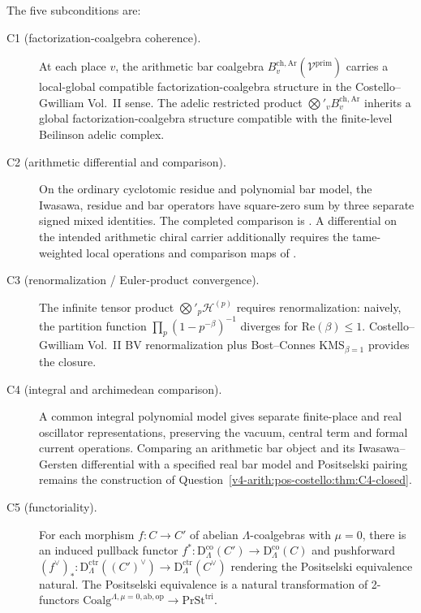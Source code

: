 The five subconditions are:
\begin{description}
\item[C1 (factorization-coalgebra coherence).] At each place \(v\),
the arithmetic bar coalgebra
\(B^{\mathrm{ch,Ar}}_{v}(\mathcal{V}^{\mathrm{prim}})\) carries a
local-global compatible factorization-coalgebra structure in the
Costello--Gwilliam Vol.~II sense. The adelic restricted product
\(\bigotimes'_{v}B^{\mathrm{ch,Ar}}_{v}\) inherits a global
factorization-coalgebra structure compatible with the
finite-level Beilinson adelic complex.
\item[C2 (arithmetic differential and comparison).] On the ordinary
cyclotomic residue and polynomial bar model, the Iwasawa, residue and
bar operators have square-zero sum by three separate signed mixed
identities. The completed comparison is
.
A differential on the intended arithmetic chiral carrier additionally
requires the tame-weighted local operations and comparison maps of
.
\item[C3 (renormalization / Euler-product convergence).] The
infinite tensor product \(\bigotimes'_{p}\mathcal{H}^{(p)}\)
requires renormalization: naively, the partition function
\(\prod_{p}(1-p^{-\beta})^{-1}\) diverges for \(\mathrm{Re}(\beta)\leq 1\).
Costello--Gwilliam Vol.~II BV renormalization plus Bost--Connes
KMS\({}_{\beta=1}\) provides the closure.
\item[C4 (integral and archimedean comparison).] A common integral
polynomial model gives separate finite-place and real oscillator
representations, preserving the vacuum, central term and formal
current operations. Comparing an arithmetic bar object and its
Iwasawa--Gersten differential with a specified real bar model and
Positselski pairing remains the construction of
Question~\ref{v4-arith:pos-costello:thm:C4-closed}.
\item[C5 (functoriality).] For each morphism
\(f\colon C\to C'\) of abelian \(\Lambda\)-coalgebras with \(\mu=0\),
there is an induced pullback functor
\(f^{*}\colon\mathrm{D}^{\mathrm{co}}_{\Lambda}(C')\to\mathrm{D}^{\mathrm{co}}_{\Lambda}(C)\)
and pushforward \((f^{\vee})_{*}\colon\mathrm{D}^{\mathrm{ctr}}_{\Lambda}((C')^{\vee})\to\mathrm{D}^{\mathrm{ctr}}_{\Lambda}(C^{\vee})\)
rendering the Positselski equivalence natural. The Positselski
equivalence is a natural transformation of 2-functors
\(\mathrm{Coalg}^{\Lambda,\mu=0,\mathrm{ab},\mathrm{op}}\to\mathrm{PrSt}^{\mathrm{tri}}\).
\end{description}

